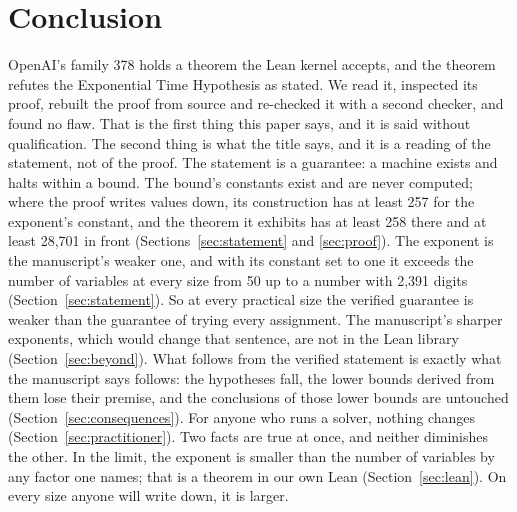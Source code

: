 \section{Conclusion}
\label{sec:conclusion}
\begingroup\sloppy

OpenAI's family 378 holds a theorem the Lean kernel accepts, and the
theorem refutes the Exponential Time Hypothesis as stated. We read it,
inspected its proof, rebuilt the proof from source and re-checked it
with a second checker, and found no flaw. That is the first thing this
paper says, and it is said without qualification. The second thing is
what the title says, and it is a reading of the statement, not of the
proof. The statement is a guarantee: a machine exists and halts within
a bound. The bound's constants exist and are never computed; where the proof
writes values down, its construction has at least 257 for the
exponent's constant, and the theorem it exhibits has at least 258
there and at least 28,701 in front (Sections~\ref{sec:statement} and
\ref{sec:proof}). The exponent is the manuscript's weaker one, and with
its constant set to one it exceeds the number of variables at every
size from 50 up to a number with 2,391 digits
(Section~\ref{sec:statement}). So at every practical size the verified
guarantee is weaker than the guarantee of trying every assignment. The
manuscript's sharper exponents, which would change that sentence, are
not in the Lean library (Section~\ref{sec:beyond}). What follows from
the verified statement is exactly what the manuscript says follows: the
hypotheses fall, the lower bounds derived from them lose their premise,
and the conclusions of those lower bounds are untouched
(Section~\ref{sec:consequences}). For anyone who runs a solver, nothing
changes (Section~\ref{sec:practitioner}). Two facts are true at
once, and neither diminishes the other. In the limit, the exponent is
smaller than the number of variables by any factor one names; that is
a theorem in our own Lean (Section~\ref{sec:lean}). On every size anyone
will write down, it is larger.

